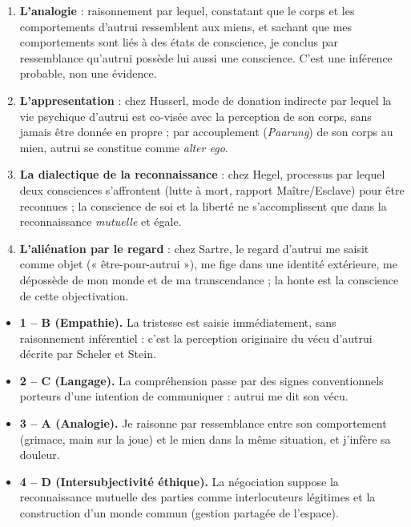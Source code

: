 \documentclass[11pt]{article}
\begin{document}
\begin{corrige}
\begin{enumerate}
    \item \textbf{L'analogie} : raisonnement par lequel, constatant que le corps et les comportements d'autrui ressemblent aux miens, et sachant que mes comportements sont liés à des états de conscience, je conclus par ressemblance qu'autrui possède lui aussi une conscience. C'est une inférence probable, non une évidence.
    \item \textbf{L'appresentation} : chez Husserl, mode de donation indirecte par lequel la vie psychique d'autrui est co-visée avec la perception de son corps, sans jamais être donnée en propre ; par accouplement (\emph{Paarung}) de son corps au mien, autrui se constitue comme \emph{alter ego}.
    \item \textbf{La dialectique de la reconnaissance} : chez Hegel, processus par lequel deux consciences s'affrontent (lutte à mort, rapport Maître/Esclave) pour être reconnues ; la conscience de soi et la liberté ne s'accomplissent que dans la reconnaissance \emph{mutuelle} et égale.
    \item \textbf{L'aliénation par le regard} : chez Sartre, le regard d'autrui me saisit comme objet (« être-pour-autrui »), me fige dans une identité extérieure, me dépossède de mon monde et de ma transcendance ; la honte est la conscience de cette objectivation.
\end{enumerate}
\end{corrige}

\begin{corrige}
\begin{itemize}
    \item \textbf{1 -- B (Empathie).} La tristesse est saisie immédiatement, sans raisonnement inférentiel : c'est la perception originaire du vécu d'autrui décrite par Scheler et Stein.
    \item \textbf{2 -- C (Langage).} La compréhension passe par des signes conventionnels porteurs d'une intention de communiquer : autrui me dit son vécu.
    \item \textbf{3 -- A (Analogie).} Je raisonne par ressemblance entre son comportement (grimace, main sur la joue) et le mien dans la même situation, et j'infère sa douleur.
    \item \textbf{4 -- D (Intersubjectivité éthique).} La négociation suppose la reconnaissance mutuelle des parties comme interlocuteurs légitimes et la construction d'un monde commun (gestion partagée de l'espace).
\end{itemize}
\end{corrige}
\end{document}
